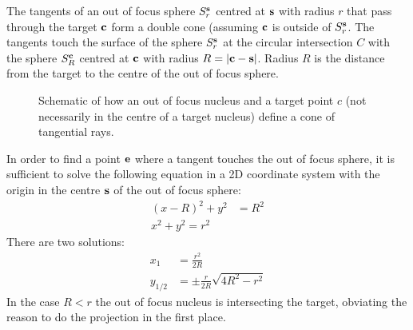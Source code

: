 The tangents of an out of focus sphere $S^{\mathbf{s}}_r$ centred at $\mathbf{s}$ with
radius $r$ that pass through the target $\mathbf{c}$ form a double cone
(assuming $\mathbf{c}$ is outside of $S^{\mathbf{s}}_r$. The tangents touch the surface
of the sphere $S^{\mathbf{s}}_r$ at the circular intersection $C$ with the sphere
$S^{\mathbf{c}}_R$ centred at $\mathbf{c}$ with radius $R=\mathopen| \mathbf{c}-\mathbf{s} \mathclose|$. Radius $R$ is
the distance from the target to the centre of the out of focus sphere.
\begin{figure}[!hbt]
  \centering
  
  \caption{Schematic of how an out of focus nucleus and a target point
    $c$ (not necessarily in the centre of a target nucleus) define a
    cone of tangential rays.}
\end{figure}
In order to find a point $\mathbf{e}$ where a tangent touches the out of focus
sphere, it is sufficient to solve the following equation in a 2D
coordinate system with the origin in the centre $\mathbf{s}$ of the out of
focus sphere:
\begin{align}
  (x-R)^2+y^2&=R^2\\
  x^2+y^2=r^2
\end{align}
There are two solutions:
\begin{align}
  x_1&=\frac{r^2}{2R}\label{eqn:x1}\\ 
  y_{1/2}&=\pm\frac{r}{2R}\sqrt{4R^2-r^2} \label{eqn:y1}
\end{align}
In the case $R<r$ the out of focus nucleus is intersecting the target,
obviating the reason to do the projection in the first place.

